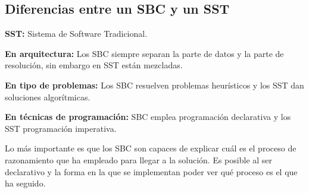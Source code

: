\documentclass[12pt, twoside, openright]{report} %
\begin{document}
\subsection{Diferencias entre un SBC y un SST}
\textbf{SST:} Sistema de Software Tradicional.

\textbf{En arquitectura:} Los SBC siempre separan la parte de datos y la parte de resolución, sin embargo en SST están mezcladas.

\textbf{En tipo de problemas:} Los SBC resuelven problemas heurísticos y los SST dan soluciones algorítmicas.

\textbf{En técnicas de programación:} SBC emplea programación declarativa y los SST programación imperativa.

Lo más importante es que los SBC son capaces de explicar cuál es el proceso de razonamiento que ha empleado para llegar a la solución. Es posible al ser declarativo y la forma en la que se implementan poder ver qué proceso es el que ha seguido.
\end{document}
